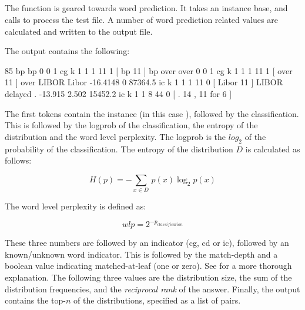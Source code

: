\documentclass[a4paper,10pt,twoside]{report}
\begin{document}
\subsection{}

The  function is geared towards word prediction. It takes
an instance base, and calls \Timbl{} to process the test file. A
number of word prediction related values are calculated and written to
the output file.

The output contains the following:

\begin{wout}{}
85 bp bp 0 0 1 cg k 1 1 1 11 1 [ bp 11 ]
bp over over 0 0 1 cg k 1 1 1 11 1 [ over 11 ]
over LIBOR Libor -16.4148 0 87364.5 ic k 1 1 1 11 0 [ Libor 11 ]
LIBOR delayed . -13.915 2.502 15452.2 ic k 1 1 8 44 0 [ . 14 , 11 for 6 ]
\end{wout}

The first tokens contain the instance (in this case ),
followed by the classification. This is followed by the logprob of the
classification, the entropy of the distribution and the word level
perplexity. The logprob is the $log_2$ of the probability of the
classification. The entropy of the distribution $D$ is calculated as
follows:

\begin{equation}
H(p) = -\sum_{x \in D} \, p(x)\log_2 p(x)
\label{eq:entropy}
\end{equation}

The word level perplexity is defined as:

\begin{equation}
wlp = 2^{-p_{classification}}
\label{eq:wlp}
\end{equation}

These three numbers are followed by an indicator (cg, cd or ic),
followed by an known/unknown word indicator. This is followed by the
match-depth and a boolean value indicating matched-at-leaf (one or
zero). See \cite{Daelemans+09} for a more thorough explanation. The
following three values are the distribution size, the sum of the
distribution frequencies, and the \emph{reciprocal rank} of the
answer. Finally, the output contains the top-$n$ of the distributions,
specified as a list of  pairs.
\end{document}
